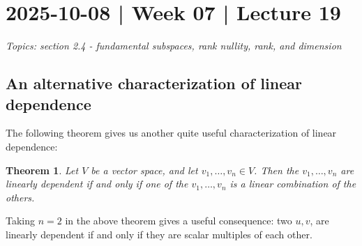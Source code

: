 \documentclass[10pt]{article}
\newtheorem{theorem}{Theorem}
\theoremstyle{definition}
\newcommand{\R}{\mathbb{R}}           %
\begin{document}
\newpage



\newpage
\section{2025-10-08 | Week 07 | Lecture 19}
\textit{Topics: section 2.4 - fundamental subspaces, rank nullity, rank, and
  dimension}

\subsection{An alternative characterization of linear dependence
}
The following theorem gives us another quite useful characterization of linear
dependence:

\begin{theorem}
  Let $V$ be a vector space, and let $v_{1},\ldots,v_{n}\in V$. Then the
  $v_{1},\ldots,v_{n}$ are linearly dependent if and only if one of the
  $v_{1},\ldots,v_{n}$ is a linear combination of the others.
\end{theorem}

Taking $n=2$ in the above theorem gives a useful consequence: two $u,v$, are
linearly dependent if and only if they are scalar multiples of each other.
\end{document}
